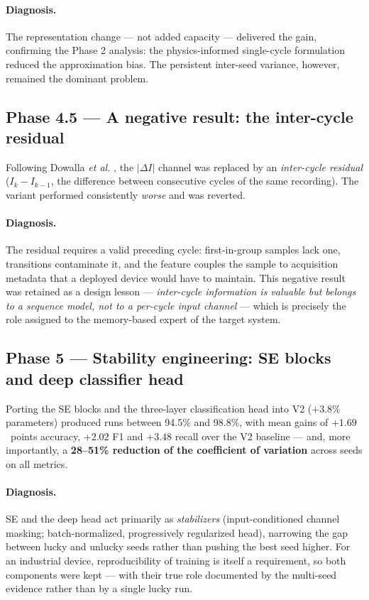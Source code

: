 \paragraph{Diagnosis.} The representation change --- not added capacity --- delivered the gain, confirming the Phase 2 analysis: the physics-informed single-cycle formulation reduced the approximation bias. The persistent inter-seed variance, however, remained the dominant problem.

\subsection{Phase 4.5 --- A negative result: the inter-cycle residual}

Following Dowalla \emph{et al.} \cite{dowalla2023}, the $|\Delta I|$ channel was replaced by an \emph{inter-cycle residual} ($I_k - I_{k-1}$, the difference between consecutive cycles of the same recording). The variant performed consistently \emph{worse} and was reverted.

\paragraph{Diagnosis.} The residual requires a valid preceding cycle: first-in-group samples lack one, transitions contaminate it, and the feature couples the sample to acquisition metadata that a deployed device would have to maintain. This negative result was retained as a design lesson --- \emph{inter-cycle information is valuable but belongs to a sequence model, not to a per-cycle input channel} --- which is precisely the role assigned to the memory-based expert of the target system.

\subsection{Phase 5 --- Stability engineering: SE blocks and deep classifier head}

Porting the SE blocks and the three-layer classification head into V2 ($+3.8\%$ parameters) produced runs between 94.5\% and 98.8\%, with mean gains of $+1.69$~points accuracy, $+2.02$ F1 and $+3.48$ recall over the V2 baseline --- and, more importantly, a \textbf{28--51\% reduction of the coefficient of variation} across seeds on all metrics.

\paragraph{Diagnosis.} SE and the deep head act primarily as \emph{stabilizers} (input-conditioned channel masking; batch-normalized, progressively regularized head), narrowing the gap between lucky and unlucky seeds rather than pushing the best seed higher. For an industrial device, reproducibility of training is itself a requirement, so both components were kept --- with their true role documented by the multi-seed evidence rather than by a single lucky run.

